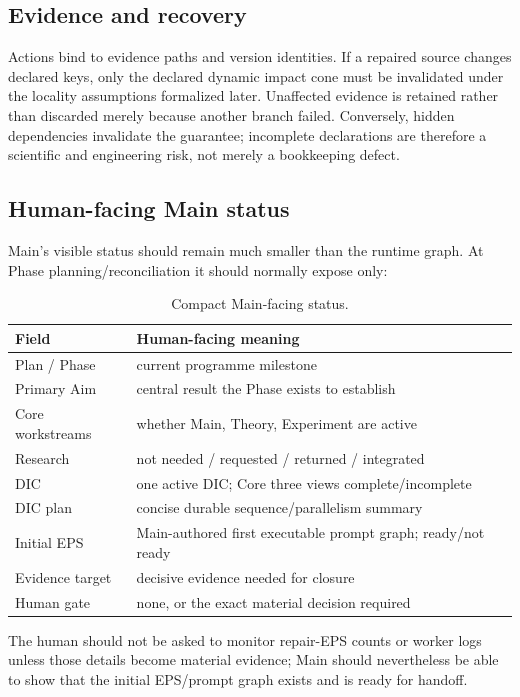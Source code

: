 \documentclass[11pt,a4paper]{article}
\begin{document}
\subsection{Evidence and recovery}
Actions bind to evidence paths and version identities. If a repaired source changes declared keys, only the declared dynamic impact cone must be invalidated under the locality assumptions formalized later. Unaffected evidence is retained rather than discarded merely because another branch failed. Conversely, hidden dependencies invalidate the guarantee; incomplete declarations are therefore a scientific and engineering risk, not merely a bookkeeping defect.

\subsection{Human-facing Main status}
Main's visible status should remain much smaller than the runtime graph. At Phase planning/reconciliation it should normally expose only:
\begin{table}[H]\centering\small
\begin{tabularx}{\textwidth}{@{}lY@{}}\toprule
Field & Human-facing meaning\\\midrule
Plan / Phase & current programme milestone\\
Primary Aim & central result the Phase exists to establish\\
Core workstreams & whether Main, Theory, Experiment are active\\
Research & not needed / requested / returned / integrated\\
DIC & one active DIC; Core three views complete/incomplete\\
DIC plan & concise durable sequence/parallelism summary\\
Initial EPS & Main-authored first executable prompt graph; ready/not ready\\
Evidence target & decisive evidence needed for closure\\
Human gate & none, or the exact material decision required\\
\bottomrule\end{tabularx}
\caption{Compact Main-facing status.}
\end{table}
The human should not be asked to monitor repair-EPS counts or worker logs unless those details become material evidence; Main should nevertheless be able to show that the initial EPS/prompt graph exists and is ready for handoff.
\end{document}
